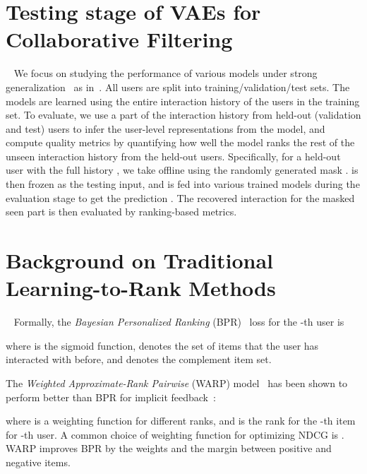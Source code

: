 \documentclass{article} \usepackage{iclr2020_conference,times}
\begin{document}
\section{Testing stage of VAEs for Collaborative Filtering}~\label{sec:testing_vae}
We focus on studying the performance of various models under strong generalization~\citep{liang2015content} as in~\citep{liang2018variational}. All users are split into training/validation/test sets. The models are learned using the entire interaction history of the users in the training set. To evaluate, we use a part of the interaction history from held-out (validation
and test) users to infer the user-level representations from the model, and compute quality metrics by quantifying how well the
model ranks the rest of the unseen interaction history from the held-out users.
Specifically, for a held-out user with the full history , we take  offline using the randomly generated mask .   is then frozen as the testing input, and is fed into various trained models during the evaluation stage to get the prediction . The recovered  interaction  for the masked seen part is then evaluated by ranking-based metrics.

\section{Background on Traditional Learning-to-Rank Methods}~\label{sec:two_l2r}
Formally, the {\it Bayesian Personalized Ranking} (BPR)~\citep{rendle2009bpr} loss for the -th user is

where  is the sigmoid function,  denotes the set of items that the user has interacted with before, and  denotes the complement item set.


The {\it Weighted Approximate-Rank Pairwise} (WARP) model~\citep{weston2011wsabie} has been shown to perform better than BPR for implicit feedback~\citep{kula2015metadata}:

where  is a weighting function for different ranks, and  is the rank for the -th item for -th user. A common choice of weighting function  for optimizing NDCG is
. WARP improves BPR by the weights  and the margin between positive and negative items. 
\end{document}
